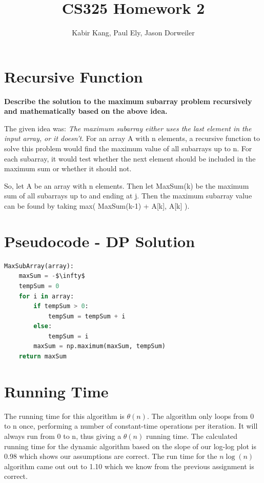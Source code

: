 \documentclass[a4paper,12pt]{article}
\title{CS325 Homework 2}
\author{Kabir Kang, Paul Ely, Jason Dorweiler}
\begin{document}
\maketitle

\section*{Recursive Function}
\textbf{Describe the solution to the maximum subarray problem recursively and mathematically based on the above idea.}

The given idea was: \emph{The maximum subarray either uses the last element in the input array, or it doesn't}. For an array A with n elements, a recursive function to solve this problem would find the maximum value of all subarrays up to n. For each subarray, it would test whether the next element should be included in the maximum sum or whether it should not.

So, let A be an array with n elements. Then let MaxSum(k) be the maximum sum of all subarrays up to and ending at j. Then the maximum subarray value can be found by taking max( MaxSum(k-1) + A[k], A[k] ).



\section*{Pseudocode - DP Solution}
  \begin{lstlisting}[language=python,caption={pseudo code for DP algorithm},mathescape]
MaxSubArray(array):
    maxSum = -$\infty$
    tempSum = 0
    for i in array:
    	if tempSum > 0:
    		tempSum = tempSum + i
    	else:
    		tempSum = i
    	maxSum = np.maximum(maxSum, tempSum)
    return maxSum	
  \end{lstlisting}


\section*{Running Time}

The running time for this algorithm is $\theta(n)$. The algorithm only loops from 0 to n once, performing a number of constant-time operations per iteration. It will always run from 0 to n, thus giving a $\theta(n)$ running time.  The calculated running time for the dynamic algorithm based on the slope of our log-log plot is 0.98 which shows our assumptions are correct.  The run time for the $n\log(n)$ algorithm came out out to 1.10 which we know from the previous assignment is correct. 
\end{document}
